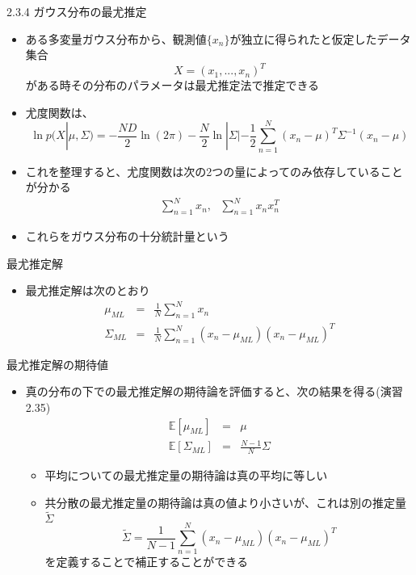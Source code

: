 \begin{frame}{2.3.4 ガウス分布の最尤推定}
 \begin{itemize}
  \item  ある多変量ガウス分布から、観測値$\{x_n\}$が独立に得られたと仮定したデータ集合
         \begin{equation}
          X=(x_1,...,x_n)^T
         \end{equation}
         がある時その分布のパラメータは最尤推定法で推定できる
  \item 尤度関数は、
        \begin{equation}
         \ln  p(X|\mu, \Sigma) = -\frac{ND}{2}\ln (2\pi)-\frac{N}{2}\ln |\Sigma|-\frac{1}{2}\sum_{n=1}^{N}(x_n-\mu)^T\Sigma^{-1}(x_n-\mu)
        \end{equation}
  \item これを整理すると、尤度関数は次の2つの量によってのみ依存していることが分かる
        \begin{eqnarray}
         \sum_{n=1}^{N}x_n, \ \ \  \sum_{n=1}^{N}x_nx_n^T
        \end{eqnarray}
  \item これらをガウス分布の\alert{十分統計量}という
 \end{itemize}
\end{frame}

\begin{frame}{最尤推定解}
 \begin{itemize}
  \item 最尤推定解は次のとおり
        \begin{eqnarray}
         \mu_{ML} &=& \frac{1}{N}\sum_{n=1}^{N}x_n\\
         \Sigma_{ML}&=&\frac{1}{N}\sum_{n=1}^{N}(x_n-\mu_{ML})(x_n-\mu_{ML})^T
        \end{eqnarray}
 \end{itemize}
\end{frame}

\begin{frame}{最尤推定解の期待値}
 \begin{itemize}
  \item 真の分布の下での最尤推定解の期待論を評価すると、次の結果を得る(演習2.35)
        \begin{eqnarray}
         \mathbb{E}[\mu_{ML}]&=&\mu\\
         \mathbb{E}[\Sigma_{ML}]&=&\frac{N-1}{N}\Sigma
        \end{eqnarray}
        \begin{itemize}
         \item 平均についての最尤推定量の期待論は真の平均に等しい
         \item 共分散の最尤推定量の期待論は真の値より小さいが、これは別の推定量$\widetilde{\Sigma}$
               \begin{equation}
                \widetilde{\Sigma} = \frac{1}{N-1}\sum_{n=1}^{N}(x_n-\mu_{ML})(x_n-\mu_{ML})^T
               \end{equation}
               を定義することで補正することができる
        \end{itemize}
 \end{itemize}
\end{frame}
